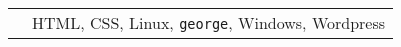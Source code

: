 \documentclass[margin]{res}
\begin{document}
\begin{resume}
\begin{tabular}{l p{4.5in}}
\hspace{-1em}{\bf Competent:} & HTML,
CSS,
Linux,
\texttt{george},
Windows,
Wordpress%
\end{tabular}






















\end{resume}
\end{document}
